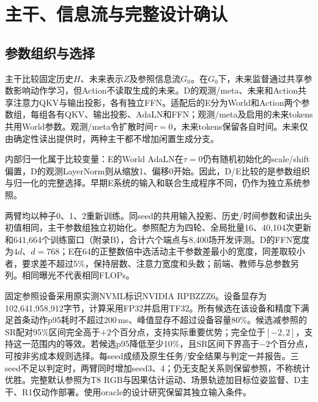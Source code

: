 \section{主干、信息流与完整设计确认}
\label{app:q3}
\begingroup
\renewenvironment{table}[1][]{\begin{readingtable}}{\end{readingtable}}
\renewenvironment{table*}[1][]{\begin{readingtable}}{\end{readingtable}}

\subsection{参数组织与选择}
主干比较固定历史$H$、未来表示$Z$及参照信息流$G_0$。在$G_0$下，未来监督通过共享参数影响动作学习，但Action不读取生成的未来。D的观测/meta、未来和Action共享注意力QKV与输出投影，各有独立FFN。适配后的E分为World和Action两个参数组，每组各有QKV、输出投影、AdaLN和FFN；观测/meta及启用的未来tokens共用World参数。观测/meta令扩散时间$\tau=0$，未来tokens保留各自时间。未来仅由确定性读出提供时，两种主干都不增加闲置生成分支。

内部归一化属于比较变量：E的World AdaLN在$\tau=0$仍有随机初始化的scale/shift偏置，D的观测LayerNorm则从缩放1、偏移0开始。因此，D/E比较的是参数组织与归一化的完整选择。早期E系统的输入和联合生成程序不同，仍作为独立系统参照。

两臂均以种子0、1、2重新训练。同seed的共用输入投影、历史/时间参数和读出头初值相同，主干参数组独立初始化。参照配方为四轮、全局批量16、40,104次更新和641,664个训练窗口（附录B），合计六个端点与8,400场开发评测。D的FFN宽度为$4d$、$d=768$；E在64的正整数倍中选活动主干参数差最小的宽度，同差取较小者，要求差不超过5\%，保持层数、注意力宽度和头数；前端、教师与总参数另列。相同曝光不代表相同FLOPs。

固定参照设备采用原实测NVML标识NVIDIA RPBZZZ6。设备显存为102,641,958,912字节，计算采用FP32并启用TF32。所有候选在该设备和精度下满足首条动作p95耗时不超过200\,ms、峰值显存不超过设备容量80\%。候选减参照的SR配对95\%区间完全高于$+2$个百分点，支持实际重要优势；完全位于$[-2,2]$，支持这一范围内的等效。若候选p95降低至少10\%，且SR区间下界高于$-2$个百分点，可按非劣成本规则选择。每seed成绩及原生任务/安全结果与判定一并报告。三seed不足以判定时，两臂同时增加seed3、4；仍无支配关系则保留参照，不称统计优胜。完整默认参照为T8 RGB与因果估计运动、场景轨迹加目标位姿监督、D主干、R1仅动作部署。使用oracle的设计研究保留其独立输入条件。



